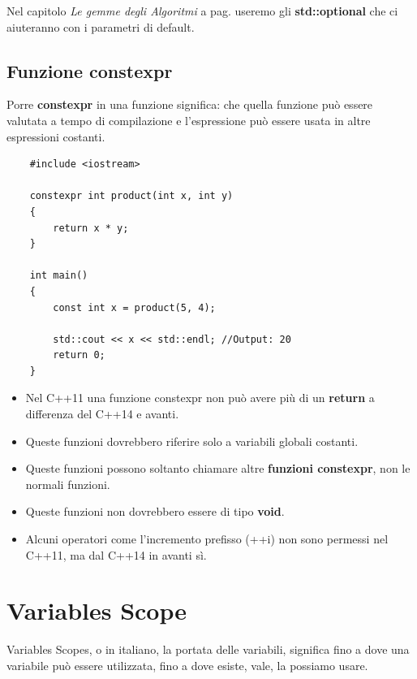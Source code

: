 \textsf{\small Nel capitolo \emph{Le gemme degli Algoritmi} a pag.\textbf{\pageref{optionals}} useremo gli \textbf{std::optional} che ci aiuteranno con i parametri di default.} \\

\subsection{Funzione constexpr}

\textsf{\small Porre \textbf{constexpr} in una funzione significa: che quella funzione può essere valutata a tempo di compilazione e l'espressione può essere usata in altre espressioni costanti. } \\

\begin{lstlisting}
	#include <iostream>
	
	constexpr int product(int x, int y)
	{
		return x * y;
	}

	int main()
	{
		const int x = product(5, 4);
		
		std::cout << x << std::endl; //Output: 20
		return 0;
	}
\end{lstlisting}

\begin{itemize}
	\item \textsf{\small Nel C++11 una funzione constexpr non può avere più di un \textbf{return} a differenza del C++14 e avanti.}
	\item \textsf{\small Queste funzioni dovrebbero riferire solo a variabili globali costanti.}
	\item \textsf{\small Queste funzioni possono soltanto chiamare altre \textbf{funzioni constexpr}, non le normali funzioni.}
	\item \textsf{\small Queste funzioni non dovrebbero essere di tipo \textbf{void}.}
	\item \textsf{\small Alcuni operatori come l'incremento prefisso (++i) non sono permessi nel C++11, ma dal C++14 in avanti sì.}
\end{itemize}


\section{Variables Scope}

\textsf{\small Variables Scopes, o in italiano, la portata delle variabili, significa fino a dove una variabile può essere utilizzata, fino a dove esiste, vale, la possiamo usare.} \\

